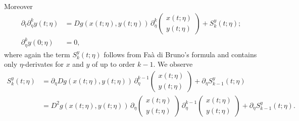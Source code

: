 \documentclass[a4paper]{siamart190516}
\begin{document}
Moreover 
 \begin{align*}
 \partial_t \partial^k_{\eta} y(t;\eta) &=  D g(x(t;\eta), y(t;\eta)) \, \partial^k_\eta  \begin{pmatrix} x(t; \eta) \\ y(t;\eta) \end{pmatrix} + S^y_k(t;\eta); \\
 \partial^k_{\eta} y(0;\eta) &=  0,
 \end{align*}
 where again the term $S^y_{k}(t; \eta)$ follows from Fa\`a di Bruno's formula and contains only $\eta$-derivates for $x$ and $y$ of up to order $k-1$. We observe
  \begin{equation}
 \begin{aligned}
 S^y_k(t; \eta) &=  \partial_{\eta} Dg(x(t;\eta),y(t;\eta)) \, \partial^{k-1}_\eta \begin{pmatrix} x(t; \eta) \\  y(t;\eta) \end{pmatrix} + \partial_{\eta} S^y_{k-1}(t; \eta) \\
 &= D^2g(x(t;\eta),y(t;\eta)) \,  \partial_\eta  \begin{pmatrix} x(t; \eta) \\  y(t;\eta) \end{pmatrix} \,  \partial^{k-1}_\eta \begin{pmatrix}  x(t; \eta)\\  y(t;\eta) \end{pmatrix} + \partial_{\eta} S^y_{k-1}(t; \eta).
 \end{aligned}
 \end{equation}
 
\end{document}
